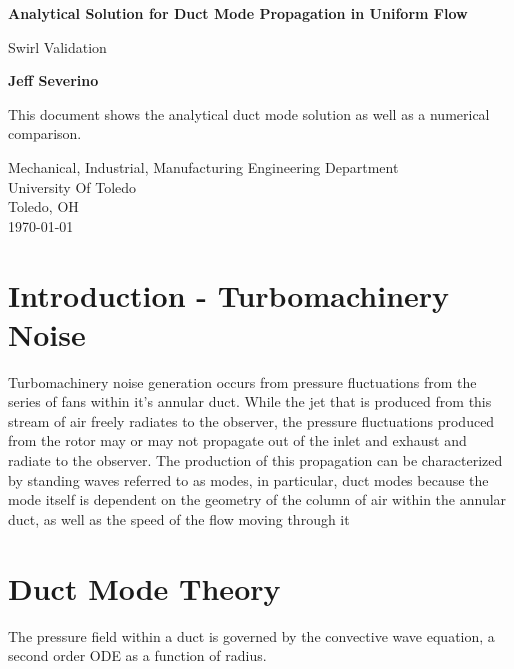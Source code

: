 \documentclass[a4paper]{report}
\begin{document}
\begin{titlepage}
    \begin{center}
        \vspace*{1cm}

        \textbf{Analytical Solution for Duct Mode Propagation in %
        Uniform Flow} 

        \vspace{0.5cm}
        Swirl Validation

        \vspace{1.5cm}

        \textbf{Jeff Severino}

        \vfill


        This document shows the analytical duct mode solution as well as a
        numerical comparison.
        \vspace{0.8cm}


        Mechanical, Industrial, Manufacturing Engineering Department\\
        University Of Toledo\\
        Toledo, OH\\
        \today

    \end{center}
\end{titlepage}
\section{Introduction - Turbomachinery Noise}
Turbomachinery noise generation occurs from pressure fluctuations from the series 
of fans within it's annular duct. While the jet that is produced from this stream
of air freely radiates to the observer, the pressure fluctuations 
produced from the rotor may or may not propagate out of the inlet and exhaust and 
radiate to the observer. The production of this propagation can be characterized
by standing waves referred to as modes, in particular, duct modes because 
the mode itself is dependent on the geometry of the column of air within the 
annular duct, as well as the speed of the flow moving through it

\section{Duct Mode Theory}

The pressure field within a duct is governed by the convective wave equation, a
second order ODE as a function of radius. 
\end{document}
